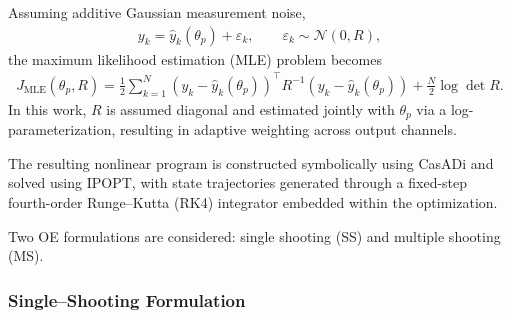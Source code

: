 \documentclass[11pt]{article}
\begin{document}
Assuming additive Gaussian measurement noise,
\begin{align}
y_k = \hat{y}_k(\theta_p) + \varepsilon_k, \qquad \varepsilon_k \sim \mathcal{N}(0, R),
\end{align}
the maximum likelihood estimation (MLE) problem becomes
\begin{align}
J_{\text{MLE}}(\theta_p, R) =
\frac{1}{2} \sum_{k=1}^{N} 
\left(y_k - \hat{y}_k(\theta_p)\right)^\top R^{-1} 
\left(y_k - \hat{y}_k(\theta_p)\right)
+ \frac{N}{2} \log \det R.
\end{align}
In this work, $R$ is assumed diagonal and estimated jointly with $\theta_p$ via a log-parameterization, resulting in adaptive weighting across output channels.

The resulting nonlinear program is constructed symbolically using CasADi and solved using IPOPT, with state trajectories generated through a fixed-step fourth-order Runge--Kutta (RK4) integrator embedded within the optimization.

Two OE formulations are considered: single shooting (SS) and multiple shooting (MS).

\subsubsection{Single--Shooting Formulation}
\end{document}
